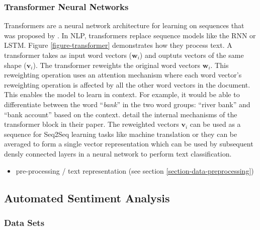 \subsubsection{Transformer Neural Networks}
Transformers are a neural network architecture for learning on sequences that was proposed by . In NLP, transformers replace sequence models like the RNN or LSTM. Figure \ref{figure-transformer} demonstrates how they process text. A transformer takes as input word vectors ($\bm{w}_i$) and ouptuts vectors of the same shape ($\bm{v}_i$). The transformer reweights the original word vectors $\bm{w}_i$. This reweighting operation uses an attention mechanism where each word vector's reweighting operation is affected by all the other word vectors in the document. This enables the model to learn in context. For example, it would be able to differentiate between the word ``\emph{bank}'' in the two word groups: ``river bank'' and ``bank account'' based on the context.  detail the internal mechanisms of the transformer block in their paper. The reweighted vectors $\bm{v}_i$ can be used as a sequence for Seq2Seq learning tasks like machine translation or they can be averaged to form a single vector representation which can be used by subsequent densly connected layers in a neural network to perform text classification.





\begin{itemize}[noitemsep]
	\item pre-processing / text representation (see section \ref{section-data-preprocessing})
\end{itemize}


\subsection{Automated Sentiment Analysis}

\subsubsection{Data Sets}

